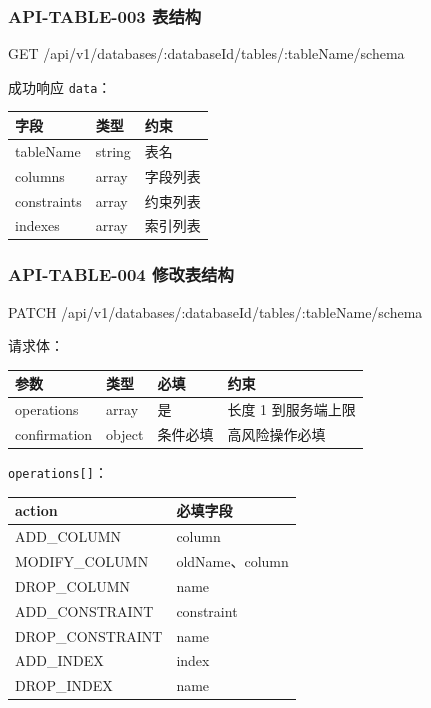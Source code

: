 \documentclass[
  a4paper,
  UTF8]{ctexart}
\newenvironment{Shaded}{}{}
\newcommand{\NormalTok}[1]{#1}
\begin{document}
\hypertarget{api-table-003-ux8868ux7ed3ux6784}{%
\subsubsection{API-TABLE-003
表结构}\label{api-table-003-ux8868ux7ed3ux6784}}

\begin{Shaded}
\begin{Highlighting}[]
\NormalTok{GET /api/v1/databases/:databaseId/tables/:tableName/schema}
\end{Highlighting}
\end{Shaded}

成功响应 \texttt{data}：

\begin{longtable}[]{@{}lll@{}}
\toprule
字段 & 类型 & 约束 \\
\midrule
\endhead
tableName & string & 表名 \\
columns & array & 字段列表 \\
constraints & array & 约束列表 \\
indexes & array & 索引列表 \\
\bottomrule
\end{longtable}

\hypertarget{api-table-004-ux4feeux6539ux8868ux7ed3ux6784}{%
\subsubsection{API-TABLE-004
修改表结构}\label{api-table-004-ux4feeux6539ux8868ux7ed3ux6784}}

\begin{Shaded}
\begin{Highlighting}[]
\NormalTok{PATCH /api/v1/databases/:databaseId/tables/:tableName/schema}
\end{Highlighting}
\end{Shaded}

请求体：

\begin{longtable}[]{@{}llll@{}}
\toprule
参数 & 类型 & 必填 & 约束 \\
\midrule
\endhead
operations & array & 是 & 长度 1 到服务端上限 \\
confirmation & object & 条件必填 & 高风险操作必填 \\
\bottomrule
\end{longtable}

\texttt{operations{[}{]}}：

\begin{longtable}[]{@{}ll@{}}
\toprule
action & 必填字段 \\
\midrule
\endhead
ADD\_COLUMN & column \\
MODIFY\_COLUMN & oldName、column \\
DROP\_COLUMN & name \\
ADD\_CONSTRAINT & constraint \\
DROP\_CONSTRAINT & name \\
ADD\_INDEX & index \\
DROP\_INDEX & name \\
\bottomrule
\end{longtable}
\end{document}
